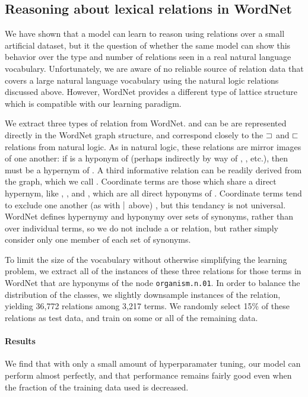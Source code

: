 \subsection*{Reasoning about lexical relations in WordNet}\label{sec:wordnet}

We have shown that a model can learn to reason using relations over a small artificial dataset, 
but it the question of whether the same model can show this behavior over the type and number of
relations seen in a real natural language vocabulary.
Unfortunately, we are aware of no reliable source of relation data that covers a large natural 
language vocabulary using the natural logic relations discussed above. However, WordNet 
\cite{fellbaum2010wordnet} provides a different type of lattice structure which is compatible with
our learning paradigm.

We extract three types of relation from WordNet.  and  can be are represented
directly in the WordNet graph structure, and correspond closely to the $\sqsupset$ and $\sqsubset$ relations from
natural logic. As in natural logic, these relations are mirror images of one another: if  is a
hyponym of  (perhaps indirectly by way of , , etc.), then  must be a 
hypernym of . A third informative relation can 
be readily derived from the graph, which we call . Coordinate terms are those which share
a direct hypernym, like , , and , which are all direct hyponyms of . 
Coordinate terms tend to exclude one another (as with $\mathbin{|}$ above) \cite{Hurford:1974}, but this tendancy
is not universal. WordNet defines hypernymy and hyponymy over sets of synonyms, rather than over individual 
terms, so we do not include a  or  relation, but rather simply consider only one
member of each set of synonyms.

To limit the size of the vocabulary without otherwise simplifying the learning problem, we extract all of the
instances of these three relations for those terms in WordNet that are hyponyms of the node \texttt{organism.n.01}.
In order to balance the distribution of the classes, we slightly downsample instances of the  relation,
yielding 36,772 relations among 3,217 terms. We randomly select 15\% of these relations as test data, and train on
some or all of the remaining data.

\paragraph{Results} 
We find that with only a small amount of hyperparamater tuning, our model can perform almost perfectly, and that performance remains fairly good even when the fraction of the training data used is decreased. 

